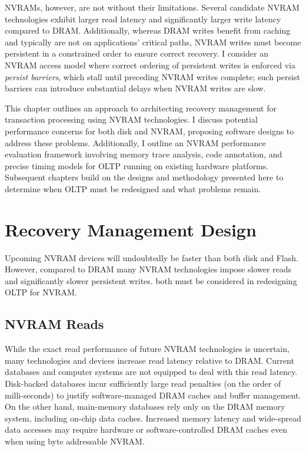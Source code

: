 NVRAMs, however, are not without their limitations.
Se\-veral candidate NVRAM technologies exhibit larger read latency and significantly larger write latency compared to DRAM.
Additionally, whereas DRAM writes benefit from caching and typically are not on applications' critical paths, NVRAM writes must become persistent in a constrained order to ensure correct recovery.
I consider an NVRAM access model where correct ordering of persistent writes is enforced via \emph{persist barriers}, which stall until preceding NVRAM writes complete; such persist barriers can introduce substantial delays when NVRAM writes are slow.

This chapter outlines an approach to architecting recovery management for transaction processing using NVRAM technologies.
I discuss potential performance concerns for both disk and NVRAM, proposing software designs to address these problems.
Additionally, I outline an NVRAM performance evaluation framework involving memory trace analysis, code annotation, and precise timing models for OLTP running on existing hardware platforms.
Subsequent chapters build on the designs and methodology presented here to determine when OLTP must be redesigned and what problems remain.

\section{Recovery Management Design}
\label{sec:OLTP_design:Design}



Upcoming NVRAM devices will undoubtedly be faster than both disk and Flash.
However, compared to DRAM many NVRAM technologies impose slower reads and significantly slower persistent writes.
both must be considered in redesigning OLTP for NVRAM.

\subsection{NVRAM Reads}
\label{sect:OLTP_design:Design:Reads}
While the exact read performance of future NVRAM technologies is uncertain, many technologies and devices increase read latency relative to DRAM.
Current databases and computer systems are not equipped to deal with this read latency.
Disk-backed databases incur sufficiently large read penalties (on the order of milli-seconds) to justify software-managed DRAM caches and buffer management.
On the other hand, main-memory databases rely only on the DRAM memory system, including on-chip data caches.
Increased memory latency and wide-spread data accesses may require hardware or software-controlled DRAM caches even when using byte addressable NVRAM.

